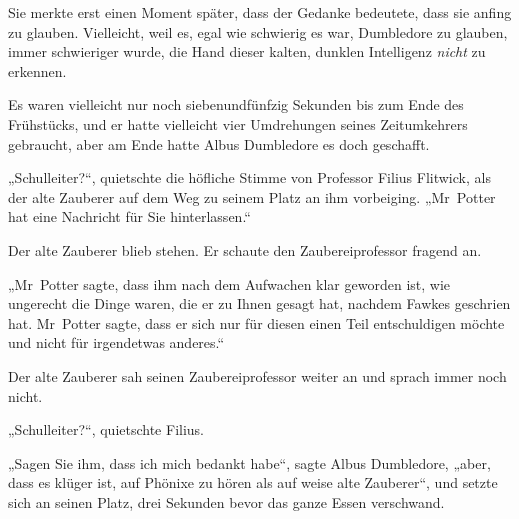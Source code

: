 Sie merkte erst einen Moment später, dass der Gedanke bedeutete, dass sie anfing zu glauben. Vielleicht, weil es, egal wie schwierig es war, Dumbledore zu glauben, immer schwieriger wurde, die Hand dieser kalten, dunklen Intelligenz \emph{nicht} zu erkennen.


Es waren vielleicht nur noch siebenundfünfzig Sekunden bis zum Ende des Frühstücks, und er hatte vielleicht vier Umdrehungen seines Zeitumkehrers gebraucht, aber am Ende hatte Albus Dumbledore es doch geschafft.

„Schulleiter?“, quietschte die höfliche Stimme von Professor Filius Flitwick, als der alte Zauberer auf dem Weg zu seinem Platz an ihm vorbeiging.
„Mr~Potter hat eine Nachricht für Sie hinterlassen.“

Der alte Zauberer blieb stehen. Er schaute den Zaubereiprofessor fragend an.

„Mr~Potter sagte, dass ihm nach dem Aufwachen klar geworden ist, wie ungerecht die Dinge waren, die er zu Ihnen gesagt hat, nachdem Fawkes geschrien hat. Mr~Potter sagte, dass er sich nur für diesen einen Teil entschuldigen möchte und nicht für irgendetwas anderes.“

Der alte Zauberer sah seinen Zaubereiprofessor weiter an und sprach immer noch nicht.

„Schulleiter?“, quietschte Filius.

„Sagen Sie ihm, dass ich mich bedankt habe“, sagte Albus Dumbledore, „aber, dass es klüger ist, auf Phönixe zu hören als auf weise alte Zauberer“, und setzte sich an seinen Platz, drei Sekunden bevor das ganze Essen verschwand.

